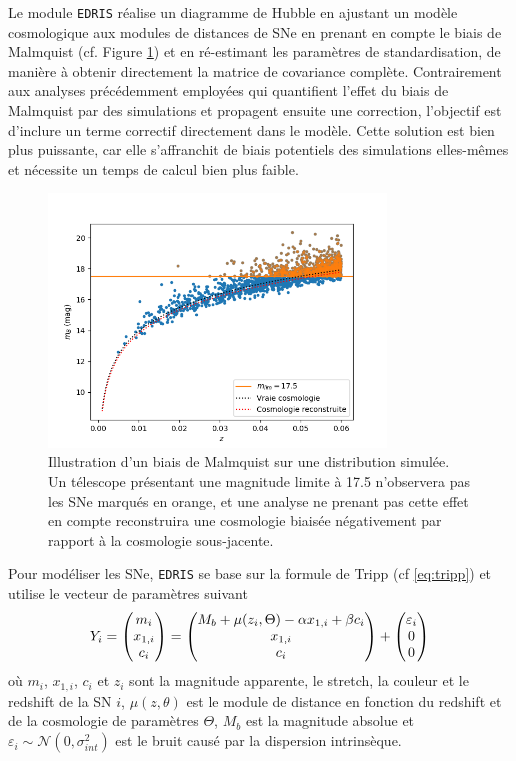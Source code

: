 \documentclass{book}
\def\edris{\texttt{EDRIS}\xspace}
\let\mcl\mathcal
\begin{document}
Le module \edris réalise un diagramme de Hubble en ajustant un modèle cosmologique aux modules de distances de SNe en prenant en compte le biais de Malmquist (cf. Figure \ref{fig:malmquist}) et en ré-estimant les paramètres de standardisation, de manière à obtenir directement la matrice de covariance complète. Contrairement aux analyses précédemment employées qui quantifient l'effet du biais de Malmquist par des simulations et propagent ensuite une correction, l'objectif est d'inclure un terme correctif directement dans le modèle. Cette solution est bien plus puissante, car elle s'affranchit de biais potentiels des simulations elles-mêmes et nécessite un temps de calcul bien plus faible.
\begin{figure}
	\centering
	\includegraphics[width=0.8\textwidth]{figures/Malmquist.png}
	\caption{Illustration d'un biais de Malmquist sur une distribution simulée. Un télescope présentant une magnitude limite à 17.5 n'observera pas les SNe marqués en orange, et une analyse ne prenant pas cette effet en compte reconstruira une cosmologie biaisée négativement par rapport à la cosmologie sous-jacente.}
	\label{fig:malmquist}
\end{figure}

Pour modéliser les SNe, \edris se base sur la formule de Tripp (cf \ref{eq:tripp}) et utilise le vecteur de paramètres suivant
\begin{equation}
	Y_i = \pmqty{m_i \\ x_{1,i} \\ c_i} = \pmqty{M_b + \mu(z_i, \Theta) - \alpha x_{1,i} + \beta c_i \\ x_{1,i} \\ c_i} + \pmqty{\varepsilon_i\\0\\0}
\end{equation}
où $m_i$, $x_{1,i}$, $c_i$ et $z_i$ sont la magnitude apparente, le stretch, la couleur et le redshift de la SN $i$, $\mu(z, \theta)$ est le module de distance en fonction du redshift et de la cosmologie de paramètres $\Theta$, $M_b$ est la magnitude absolue et $\varepsilon_i \sim \mcl N(0, \sigma_{int}^2)$ est le bruit causé par la dispersion intrinsèque.
\end{document}
